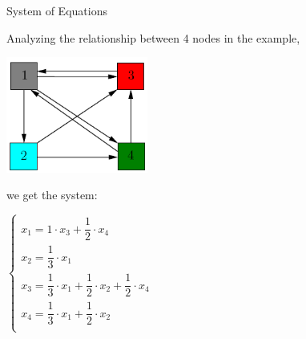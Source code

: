 \documentclass{beamer}
\begin{document}
\begin{frame}[t]{System of Equations}
    \begin{outline}
        \1 Analyzing the relationship between 4 nodes in the example, 
        
        \begin{center}
            \includegraphics[width=0.35\textwidth]{unweighted.png}    
        \end{center}

        we get the system:
    
        \begin{center}
            $\begin{cases}
                x_1 = 1 \cdot x_3 + \dfrac{1}{2}\cdot x_4&\\[6pt]
                x_2 = \dfrac{1}{3}\cdot x_1&\\[6pt]
                x_3 = \dfrac{1}{3}\cdot x_1 + \dfrac{1}{2}\cdot x_2 + \dfrac{1}{2}\cdot x_4&\\[6pt]
                x_4 = \dfrac{1}{3}\cdot x_1 + \dfrac{1}{2}\cdot x_2&\\[6pt]
            \end{cases}$
        \end{center}
    \end{outline}
\end{frame}
\end{document}

